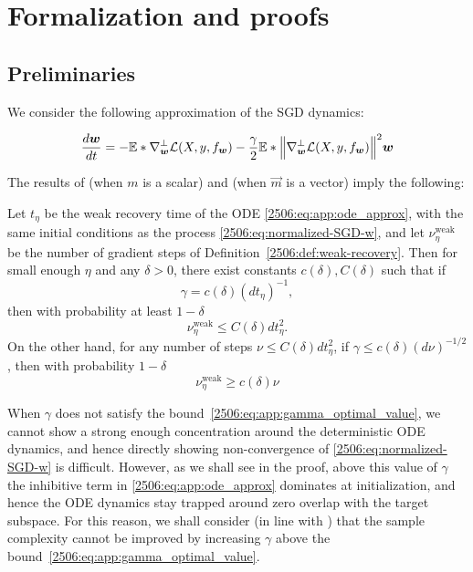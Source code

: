 \section{Formalization and proofs} \label{2506:app:proofs}

\subsection{Preliminaries}

We consider the following approximation of the SGD dynamics:

\begin{equation}\label{2506:eq:app:ode_approx}
    \frac{d{\boldsymbol{w}}}{dt} = -\mathbb{E}*{\nabla_{{\boldsymbol{w}}}^\bot \mathcal{L}(X, y, f_{{\boldsymbol{w}}})} - \frac{\gamma}{2}  \mathbb{E}*{\left\lVert \nabla_{{\boldsymbol{w}}}^\bot \mathcal{L}(X, y, f_{{\boldsymbol{w}}})\right\rVert^2} {\boldsymbol{w}}
\end{equation}

The results of \cite{arous2021online} (when $m$ is a scalar) and \cite{arnaboldi2024repetita} (when $\vec{m}$ is a vector) imply the following:
\begin{theorem}\label{2506:thm:app:ben_arous_meta}
    Let $t_\eta$ be the weak recovery time of the ODE \eqref{2506:eq:app:ode_approx}, with the same initial conditions as the process \eqref{2506:eq:normalized-SGD-w}, and let $\nu^\mathrm{weak}_\eta$ be the number of gradient steps of Definition~\ref{2506:def:weak-recovery}. Then for small enough $\eta$ and any $\delta > 0$, there exist constants $c(\delta), C(\delta)$ such that if
    \begin{equation}\label{2506:eq:app:gamma_optimal_value}
        \gamma = c(\delta)(dt_\eta)^{-1},
    \end{equation}
    then with probability at least $1 - \delta$
    \[ \nu^\mathrm{weak}_\eta \leq C(\delta) d t_\eta^2. \]
    On the other hand, for any number of steps $\nu \leq C(\delta) dt_\eta^2$, if $\gamma \leq c(\delta)(d\nu)^{-1/2}$, then with probability $1 - \delta$
    \[ \nu^\mathrm{weak}_\eta \geq c(\delta)\nu \]
\end{theorem}

When $\gamma$ does not satisfy the bound~\eqref{2506:eq:app:gamma_optimal_value}, we cannot show a strong enough concentration around the deterministic ODE dynamics, and hence directly showing non-convergence of \eqref{2506:eq:normalized-SGD-w} is difficult. However, as we shall see in the proof, above this value of $\gamma$ the inhibitive term in \eqref{2506:eq:app:ode_approx} dominates at initialization, and hence the ODE dynamics stay trapped around zero overlap with the target subspace. For this reason, we shall consider (in line with \cite{arous2021online}) that the sample complexity cannot be improved by increasing $\gamma$ above the bound~\eqref{2506:eq:app:gamma_optimal_value}.

